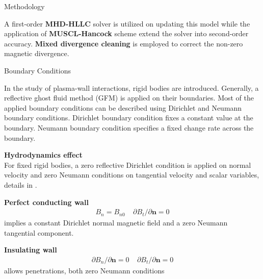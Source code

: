 \documentclass[final]{beamer}
\begin{document}
\begin{frame}{}
\begin{textblock}{19.0}
\begin{block}{Methodology}
\begin{minipage}{0.90\linewidth}
		A first-order \textbf{MHD-HLLC} solver \cite{li2005hllc} is utilized on updating this model while the application of \textbf{MUSCL-Hancock} scheme extend the solver into second-order accuracy. 
		\textbf{Mixed divergence cleaning} \cite{vides2013divergence} is employed to correct the non-zero magnetic divergence.
	\end{minipage} 
\end{block}
\vspace{-0.5cm}

\begin{block}{Boundary Conditions}
	\centering
	\begin{minipage}{0.93\linewidth}
		In the study of plasma-wall interactions, rigid bodies are introduced. Generally, a reflective ghost fluid method (GFM) \cite{sambasivan2009ghost} is applied on their boundaries. Most of the applied boundary conditions can be described using Dirichlet and Neumann boundary conditions.
		Dirichlet boundary condition
		fixes a constant value at the boundary.
		Neumann boundary condition
		specifies a fixed change rate 
		across the boundary.
	\vspace{0.2cm}
	
	\textbf{Hydrodynamics effect}\\
	For fixed rigid bodies, a zero reflective Dirichlet condition is applied on normal velocity and zero Neumann conditions on tangential velocity and scalar variables, details in \cite{sambasivan2009ghost}.
	\vspace{0.2cm}
	
	\textbf{Perfect conducting wall}
	\begin{align*}
		B_n=B_{n0}\ \ \ \ \ {\partial B_t}/{\partial \mathbf{n}}=0
	\end{align*}
	implies a constant Dirichlet normal magnetic field and a zero Neumann tangential component.
	\vspace{0.2cm}
	
	\textbf{Insulating wall}
	\begin{align*}
		{\partial B_n}/{\partial \mathbf{n}}=0\ \ \ \ \ {\partial B_t}/{\partial \mathbf{n}}=0
	\end{align*}
	allows penetrations, both zero Neumann conditions
	\vspace{0.2cm}
	

\end{minipage}
\end{block}
\end{textblock}
\end{frame}
\end{document}
